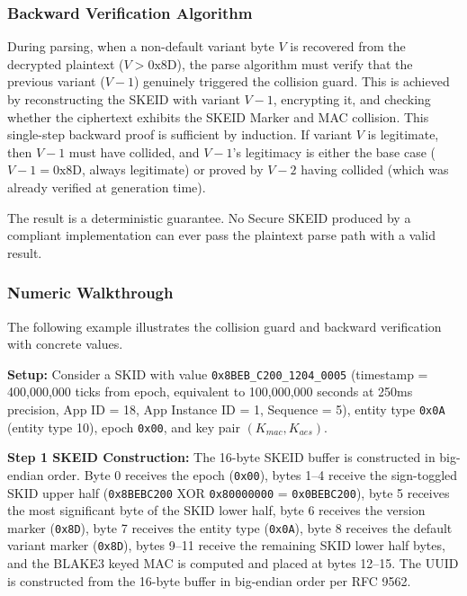 \documentclass[fleqn,10pt,lineno]{wlpeerj}
\begin{document}
\subsubsection{Backward Verification
Algorithm}\label{backward-verification-algorithm}

During parsing, when a non-default variant byte \(V\) is recovered from
the decrypted plaintext (\(V > \text{0x8D}\)), the parse algorithm must
verify that the previous variant (\(V-1\)) genuinely triggered the
collision guard. This is achieved by reconstructing the SKEID with
variant \(V-1\), encrypting it, and checking whether the ciphertext
exhibits the SKEID Marker and MAC collision. This single-step backward
proof is sufficient by induction. If variant \(V\) is legitimate, then
\(V-1\) must have collided, and \(V-1\)'s legitimacy is either the base
case (\(V-1 = \text{0x8D}\), always legitimate) or proved by \(V-2\)
having collided (which was already verified at generation time).

The result is a deterministic guarantee. No Secure SKEID produced by a
compliant implementation can ever pass the plaintext parse path with a
valid result.

\newpage

\subsubsection{Numeric Walkthrough}\label{numeric-walkthrough}

The following example illustrates the collision guard and backward
verification with concrete values.

\textbf{Setup:} Consider a SKID with value
\texttt{0x8BEB\_C200\_1204\_0005} (timestamp = 400,000,000 ticks from
epoch, equivalent to 100,000,000 seconds at 250ms precision, App ID =
18, App Instance ID = 1, Sequence = 5), entity type \texttt{0x0A}
(entity type 10), epoch \texttt{0x00}, and key pair
\((K_{mac}, K_{aes})\).

\textbf{Step 1 SKEID Construction:} The 16-byte SKEID buffer is
constructed in big-endian order. Byte 0 receives the epoch
(\texttt{0x00}), bytes 1--4 receive the sign-toggled SKID upper half
(\texttt{0x8BEBC200} XOR \texttt{0x80000000} = \texttt{0x0BEBC200}),
byte 5 receives the most significant byte of the SKID lower half, byte 6
receives the version marker (\texttt{0x8D}), byte 7 receives the entity
type (\texttt{0x0A}), byte 8 receives the default variant marker
(\texttt{0x8D}), bytes 9--11 receive the remaining SKID lower half
bytes, and the BLAKE3 keyed MAC is computed and placed at bytes 12--15.
The UUID is constructed from the 16-byte buffer in big-endian order per
RFC 9562.
\end{document}
